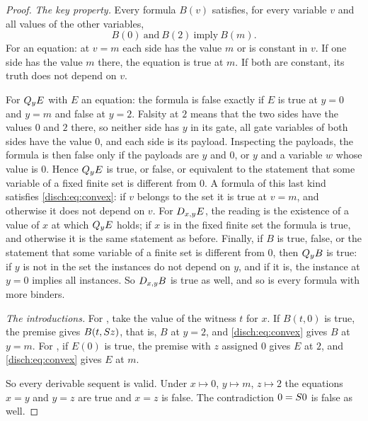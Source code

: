 \begin{proof}
\emph{The key property.} Every formula $B(v)$ satisfies, for every
variable $v$ and all values of the other variables,
\begin{equation}
 B(0)\ \text{and}\ B(2)\ \text{imply}\ B(m).
 \label{disch:eq:convex}
\end{equation}
For an equation: at $v=m$ each side has the value $m$ or is constant in
$v$. If one side has the value $m$ there, the equation is true at $m$. If
both are constant, its truth does not depend on $v$.

For $Q_{y}E$ with $E$ an equation: the formula is false exactly if $E$ is
true at $y=0$ and $y=m$ and false at $y=2$. Falsity at $2$ means that the
two sides have the values $0$ and $2$ there, so neither side has $y$ in
its gate, all gate variables of both sides have the value $0$, and each
side is its payload. Inspecting the payloads, the formula is then false
only if the payloads are $y$ and $0$, or $y$ and a variable $w$ whose
value is $0$. Hence $Q_{y}E$ is true, or false, or equivalent to the
statement that some variable of a fixed finite set is different from $0$.
A formula of this last kind satisfies \eqref{disch:eq:convex}: if $v$
belongs to the set it is true at $v=m$, and otherwise it does not depend
on $v$. For
$D_{x,y}E$, the reading is the existence of a value of $x$ at which
$Q_{y}E$ holds; if $x$ is in the fixed finite set the formula is true, and
otherwise it is the same statement as before. Finally, if $B$ is true,
false, or the statement that some variable of a finite set is different
from $0$, then $Q_{y}B$ is true: if $y$ is not in the set the instances
do not depend on $y$, and if it is, the instance at $y=0$ implies all
instances. So $D_{x,y}B$ is true as well, and so is every formula with
more binders. %

\emph{The introductions.} For , take the value of the witness
$t$ for $x$. If $B(t,0)$ is true, the premise gives $B(t,S z)$, that
is, $B$ at $y=2$, and \eqref{disch:eq:convex} gives $B$ at $y=m$. For
, if $E(0)$ is true, the premise with $z$ assigned $0$ gives
$E$ at $2$, and \eqref{disch:eq:convex} gives $E$ at $m$.

So every derivable sequent is valid. Under $x\mapsto 0$, $y\mapsto m$,
$z\mapsto 2$ the equations $x=y$ and $y=z$ are true and $x=z$ is false.
The contradiction $0=S 0$ is false as well.
\end{proof}

